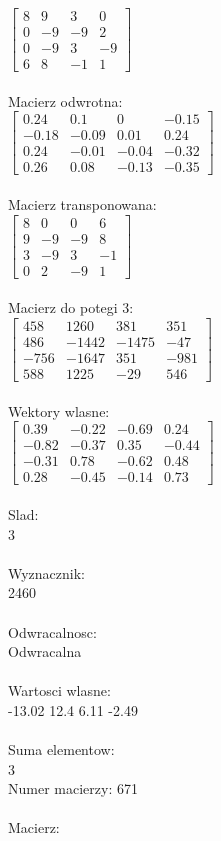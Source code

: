 \documentclass[a4paper,12pt]{article}
\begin{document}
$\begin{bmatrix} 8&9&3&0\\0&-9&-9&2\\0&-9&3&-9\\6&8&-1&1 \end{bmatrix}$
\\
\\
Macierz odwrotna:\\

$\begin{bmatrix} 0.24&0.1&0&-0.15\\-0.18&-0.09&0.01&0.24\\0.24&-0.01&-0.04&-0.32\\0.26&0.08&-0.13&-0.35 \end{bmatrix}$
\\
\\
Macierz transponowana:\\

$\begin{bmatrix} 8&0&0&6\\9&-9&-9&8\\3&-9&3&-1\\0&2&-9&1 \end{bmatrix}$
\\
\\
Macierz do potegi 3:\\

$\begin{bmatrix} 458&1260&381&351\\486&-1442&-1475&-47\\-756&-1647&351&-981\\588&1225&-29&546 \end{bmatrix}$
\\
\\
Wektory wlasne:\\

$\begin{bmatrix} 0.39&-0.22&-0.69&0.24\\-0.82&-0.37&0.35&-0.44\\-0.31&0.78&-0.62&0.48\\0.28&-0.45&-0.14&0.73 \end{bmatrix}$
\\
\\
Slad:\\
3
\\
\\
Wyznacznik:\\
2460
\\
\\
Odwracalnosc:\\
Odwracalna
\\
\\
Wartosci wlasne:\\
-13.02 12.4 6.11 -2.49
\\
\\
Suma elementow:\\
3
\\
\newpage
Numer macierzy:
671
\\
\\
Macierz:\\
\end{document}
